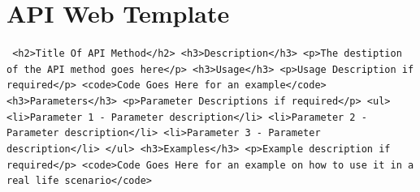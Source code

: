 \documentclass[letterpaper,12pt]{report}
\begin{document}
\section{API Web Template}
\texttt{\linebreak
<h2>Title Of API Method</h2>\linebreak
\hspace*{0.5cm}<h3>Description</h3>\linebreak
\hspace*{1cm}<p>The destiption of the API method goes here</p>\linebreak
\newline
\hspace*{0.5cm}<h3>Usage</h3>\linebreak
\hspace*{1cm}<p>Usage Description if required</p>\linebreak
\hspace*{1.5cm}<code>Code Goes Here for an example</code>\linebreak
\newline
\hspace*{0.5cm}<h3>Parameters</h3>\linebreak
\hspace*{1cm}<p>Parameter Descriptions if required</p>\linebreak
\hspace*{2.0cm}<ul>\linebreak
\hspace*{2.5cm}<li>Parameter 1 - Parameter description</li>\linebreak
\hspace*{2.5cm}<li>Parameter 2 - Parameter description</li>\linebreak
\hspace*{2.5cm}<li>Parameter 3 - Parameter description</li>\linebreak
\hspace*{2cm}</ul>\linebreak
\newline
\hspace*{0.5cm}<h3>Examples</h3>\linebreak
\hspace*{1cm}<p>Example description if required</p>\linebreak
\hspace*{1.5cm}<code>Code Goes Here for an example on how to use it in a real life \newline \hspace*{2.6cm} scenario</code>\linebreak
}
\end{document}
